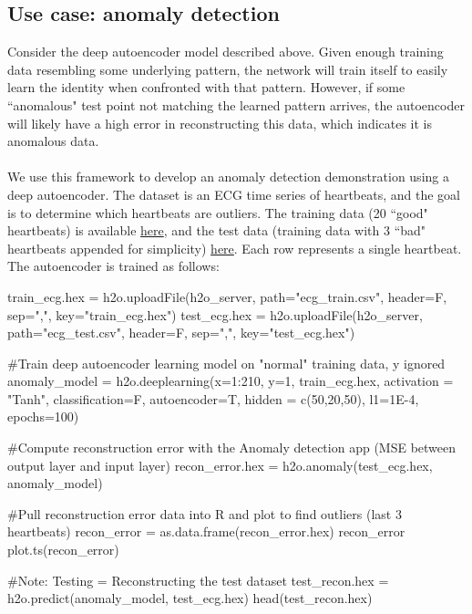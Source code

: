 \documentclass[11pt]{article}
\begin{document}
\subsection{Use case: anomaly detection} \label{4.2}
Consider the deep autoencoder model described above. Given enough training data resembling some underlying pattern, the network will train itself to easily learn the identity when confronted with that pattern. However, if some ``anomalous" test point not matching the learned pattern arrives, the autoencoder will likely have a high error in reconstructing this data, which indicates it is anomalous data.
\\
\\
We use this framework to develop an anomaly detection demonstration using a deep autoencoder. The dataset is an ECG time series of heartbeats, and the goal is to determine which heartbeats are outliers. The training data (20 ``good" heartbeats) is available \href{https://raw.githubusercontent.com/0xdata/h2o/master/smalldata/anomaly/ecg_discord_train.csv}{here}, and the test data (training data with 3 ``bad" heartbeats appended for simplicity) \href{https://raw.githubusercontent.com/0xdata/h2o/master/smalldata/anomaly/ecg_discord_test.csv}{here}. Each row represents a single heartbeat. The autoencoder is trained as follows: 

\begin{spverbatim}

train_ecg.hex = h2o.uploadFile(h2o_server, path="ecg_train.csv", header=F, sep=",", key="train_ecg.hex") 
test_ecg.hex = h2o.uploadFile(h2o_server, path="ecg_test.csv", header=F, sep=",", key="test_ecg.hex") 

#Train deep autoencoder learning model on "normal" training data, y ignored 
anomaly_model = h2o.deeplearning(x=1:210, y=1, train_ecg.hex, activation = "Tanh", classification=F, autoencoder=T, hidden = c(50,20,50), l1=1E-4, 
epochs=100)                 
                              
#Compute reconstruction error with the Anomaly detection app (MSE between
output layer and input layer)
recon_error.hex = h2o.anomaly(test_ecg.hex, anomaly_model)
                              
#Pull reconstruction error data into R and plot to find outliers (last 3
heartbeats)
recon_error = as.data.frame(recon_error.hex)
recon_error
plot.ts(recon_error)

#Note: Testing = Reconstructing the test dataset
test_recon.hex = h2o.predict(anomaly_model, test_ecg.hex) 
head(test_recon.hex)              

\end{spverbatim}
\noindent
\end{document}
